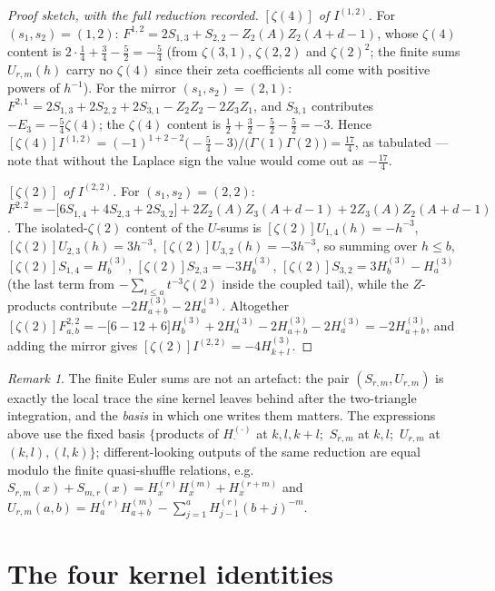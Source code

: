 \documentclass[11pt]{article}
\theoremstyle{remark}
\newtheorem{remark}{Remark}
\newcommand{\Hh}[2]{H_{#1}^{(#2)}}
\begin{document}
\begin{proof}[Proof sketch, with the full reduction recorded]
\emph{$[\zeta(4)]$ of $I^{(1,2)}$.}
For $(s_1,s_2)=(1,2)$:
$F^{1,2}=2S_{1,3}+S_{2,2}-Z_2(A)Z_2(A{+}d{-}1)$, whose $\zeta(4)$ content is
$2\cdot\tfrac14+\tfrac34-\tfrac52=-\tfrac54$
(from $\zeta(3,1)$, $\zeta(2,2)$ and $\zeta(2)^2$; the finite sums $U_{r,m}(h)$
carry no $\zeta(4)$ since their zeta coefficients all come with positive
powers of $h^{-1}$).  For the mirror $(s_1,s_2)=(2,1)$:
$F^{2,1}=2S_{1,3}+2S_{2,2}+2S_{3,1}-Z_2Z_2-2Z_3Z_1$, and
$S_{3,1}$ contributes $-E_3=-\tfrac54\zeta(4)$; the $\zeta(4)$ content is
$\tfrac12+\tfrac32-\tfrac52-\tfrac52=-3$.  Hence
$[\zeta(4)]I^{(1,2)}=(-1)^{1+2-2}\bigl(-\tfrac54-3\bigr)/\bigl(\Gamma(1)\Gamma(2)\bigr)
=\tfrac{17}4$, as tabulated --- note that without the
Laplace sign the value would come out as $-\tfrac{17}4$.

\emph{$[\zeta(2)]$ of $I^{(2,2)}$.}
For $(s_1,s_2)=(2,2)$:
$F^{2,2}=-\bigl[6S_{1,4}+4S_{2,3}+2S_{3,2}\bigr]
+2Z_2(A)Z_3(A{+}d{-}1)+2Z_3(A)Z_2(A{+}d{-}1)$.
The isolated-$\zeta(2)$ content of the $U$-sums is
$[\zeta(2)]U_{1,4}(h)=-h^{-3}$, $[\zeta(2)]U_{2,3}(h)=3h^{-3}$,
$[\zeta(2)]U_{3,2}(h)=-3h^{-3}$, so summing over $h\le b$,
$[\zeta(2)]S_{1,4}=\Hh b3$, $[\zeta(2)]S_{2,3}=-3\Hh b3$,
$[\zeta(2)]S_{3,2}=3\Hh b3-\Hh a3$ (the last term from
$-\sum_{t\le a}t^{-3}\zeta(2)$ inside the coupled tail), while the
$Z$-products contribute $-2\Hh{a+b}3-2\Hh a3$.  Altogether
$[\zeta(2)]F^{2,2}_{a,b}=-\bigl[6-12+6\bigr]\Hh b3+2\Hh a3-2\Hh{a+b}3-2\Hh a3
=-2\Hh{a+b}3$, and adding the mirror gives
$[\zeta(2)]I^{(2,2)}=-4\Hh{k+l}3$.
\end{proof}

\begin{remark}
The finite Euler sums are not an artefact: the pair
$(S_{r,m},U_{r,m})$ is exactly the local trace the sine kernel leaves behind
after the two-triangle integration, and the \emph{basis} in which one writes
them matters.  The expressions above use the fixed basis
$\{$products of $\Hh\cdot\cdot$ at $k,l,k+l$;\ $S_{r,m}$ at $k,l$;\
$U_{r,m}$ at $(k,l),(l,k)\}$; different-looking outputs of the same
reduction are equal modulo the finite quasi-shuffle relations, e.g.\
$S_{r,m}(x)+S_{m,r}(x)=\Hh xr\Hh xm+\Hh x{r+m}$ and
$U_{r,m}(a,b)=\Hh ar\Hh{a+b}m-\sum_{j=1}^{a}\Hh{j-1}r(b+j)^{-m}$.
\end{remark}

\section{The four kernel identities}\label{sec:kernelids}
\end{document}
